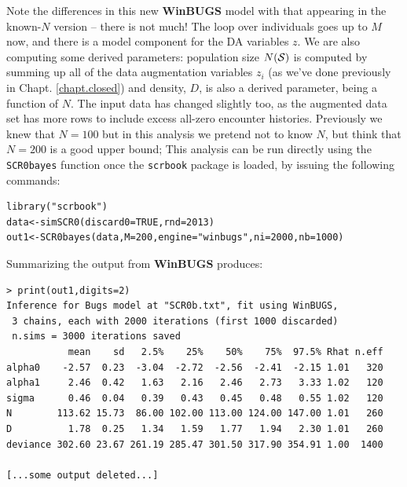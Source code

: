 Note the differences in this new {\bf WinBUGS} model with that
appearing in the known-$N$ version -- there is not much!  The loop
over individuals goes up to $M$ now, and there is a model component
for the DA variables $z$. We are also computing some derived
parameters: population size $N({\cal S})$ is computed by summing up
all of the data augmentation variables $z_{i}$ (as we've done
previously in Chapt. \ref{chapt.closed}) and density, $D$, is also a
derived parameter, being a function of $N$.  The input data has
changed slightly too, as the augmented data set has more rows to
include excess all-zero encounter histories. Previously we knew that
$N=100$ but in this analysis we pretend not to know $N$, but think
that $N=200$ is a good upper bound;
This analysis can be run directly using the \mbox{\tt SCR0bayes}
function  once the \mbox{\tt scrbook} package is loaded,
by issuing the following commands:
\begin{verbatim}
library("scrbook")
data<-simSCR0(discard0=TRUE,rnd=2013)
out1<-SCR0bayes(data,M=200,engine="winbugs",ni=2000,nb=1000)
\end{verbatim}
Summarizing the output from {\bf WinBUGS} produces:
{\small
\begin{verbatim}
> print(out1,digits=2)
Inference for Bugs model at "SCR0b.txt", fit using WinBUGS,
 3 chains, each with 2000 iterations (first 1000 discarded)
 n.sims = 3000 iterations saved
           mean    sd   2.5%    25%    50%    75%  97.5% Rhat n.eff
alpha0    -2.57  0.23  -3.04  -2.72  -2.56  -2.41  -2.15 1.01   320
alpha1     2.46  0.42   1.63   2.16   2.46   2.73   3.33 1.02   120
sigma      0.46  0.04   0.39   0.43   0.45   0.48   0.55 1.02   120
N        113.62 15.73  86.00 102.00 113.00 124.00 147.00 1.01   260
D          1.78  0.25   1.34   1.59   1.77   1.94   2.30 1.01   260
deviance 302.60 23.67 261.19 285.47 301.50 317.90 354.91 1.00  1400

[...some output deleted...]

\end{verbatim}
}

